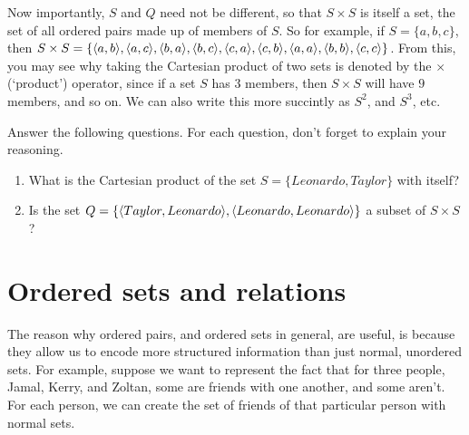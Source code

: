 Now importantly, $S$ and $Q$ need not be different, so that $S\times S$ is itself a set, the set of all ordered pairs made up of members of $S$. So for example, if $S=\{a, b, c\}$, then $S \times S=\{\langle a, b\rangle, \langle a, c\rangle, \langle b, a\rangle, \langle b, c\rangle, \langle c, a\rangle, \langle c, b\rangle, \langle a, a\rangle, \langle b,b\rangle, \langle c,c\rangle\}$. From this, you may see why taking the Cartesian product of two sets is denoted by the $\times$ (`product') operator, since if a set $S$ has $3$ members, then $S \times S$ will have $9$ members, and so on. We can also write this more succintly as $S^2$, and $S^3$, etc. 

\begin{exc}

Answer the following questions. For each question, don't forget to explain your reasoning. 	

	\begin{enumerate}
		\item What is the Cartesian product of the set $S=\{Leonardo, Taylor\}$ with itself?
		\item Is the set $Q=\{\langle Taylor, Leonardo\rangle, \langle Leonardo, Leonardo\rangle\}$ a subset of $S \times S$?
	\end{enumerate} 
\end{exc}


\section{Ordered sets and relations}

The reason why ordered pairs, and ordered sets in general, are useful, is because they allow us to encode more structured information than just normal, unordered sets. For example, suppose we want to represent the fact that for three people, Jamal, Kerry, and Zoltan, some are friends with one another, and some aren't. For each person, we can create the set of friends of that particular person with normal sets. 

